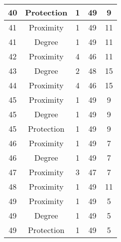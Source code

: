 \documentclass[results.tex]{subfiles}
\begin{document}
\begin{center}
\begin{tabular}{| c || c | c | c | c |}
    \hline
    40 & Protection & 1 & 49 & 9 \\ 
    \hline
    41 & Proximity & 1 & 49 & 11 \\ 
    \hline
    41 & Degree & 1 & 49 & 11 \\ 
    \hline
    42 & Proximity & 4 & 46 & 11 \\ 
    \hline
    43 & Degree & 2 & 48 & 15 \\ 
    \hline
    44 & Proximity & 4 & 46 & 15 \\ 
    \hline
    45 & Proximity & 1 & 49 & 9 \\ 
    \hline
    45 & Degree & 1 & 49 & 9 \\ 
    \hline
    45 & Protection & 1 & 49 & 9 \\ 
    \hline
    46 & Proximity & 1 & 49 & 7 \\ 
    \hline
    46 & Degree & 1 & 49 & 7 \\ 
    \hline
    47 & Proximity & 3 & 47 & 7 \\ 
    \hline
    48 & Proximity & 1 & 49 & 11 \\ 
    \hline
    49 & Proximity & 1 & 49 & 5 \\ 
    \hline
    49 & Degree & 1 & 49 & 5 \\ 
    \hline
    49 & Protection & 1 & 49 & 5 \\ 
    \hline   \end{tabular}
\end{center}
\end{document}
